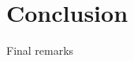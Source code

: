 \documentclass{article}
\begin{document}
\section{Conclusion}
Final remarks




\small{


}
\end{document}
